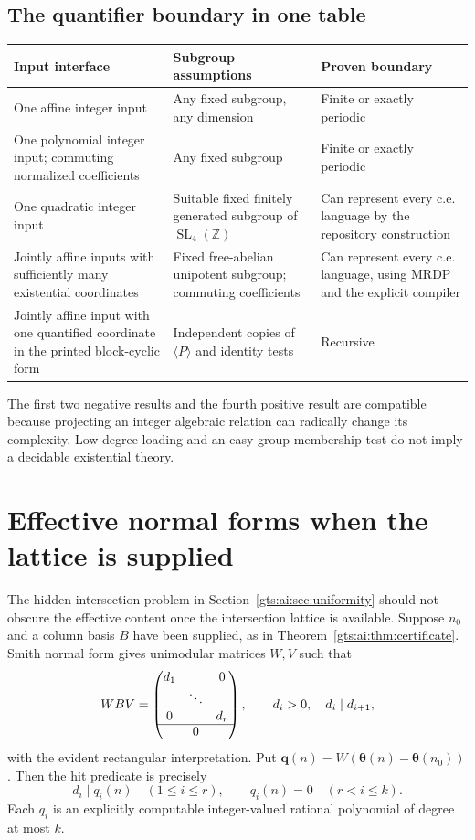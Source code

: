 \documentclass[11pt,letterpaper]{article}
\theoremstyle{definition}
\theoremstyle{remark}
\newcommand{\Z}{\mathbb Z}
\newcommand{\SL}{\operatorname{SL}}
\newcommand{\vv}{\boldsymbol\theta}
\begin{document}
\subsection{The quantifier boundary in one table}
\begin{center}
\begin{tabular}{p{}p{}p{}}
\toprule
Input interface & Subgroup assumptions & Proven boundary\\
\midrule
One affine integer input & Any fixed subgroup, any dimension & Finite or exactly periodic\\[3pt]
One polynomial integer input; commuting normalized coefficients & Any fixed subgroup & Finite or exactly periodic\\[3pt]
One quadratic integer input & Suitable fixed finitely generated subgroup of $\SL_4(\Z)$ & Can represent every c.e. language by the repository construction\\[3pt]
Jointly affine inputs with sufficiently many existential coordinates & Fixed free-abelian unipotent subgroup; commuting coefficients & Can represent every c.e. language, using MRDP and the explicit compiler\\[3pt]
Jointly affine input with one quantified coordinate in the printed block-cyclic form & Independent copies of $\langle P\rangle$ and identity tests & Recursive\\
\bottomrule
\end{tabular}
\end{center}
The first two negative results and the fourth positive result are compatible because projecting an integer algebraic relation can radically change its complexity. Low-degree loading and an easy group-membership test do not imply a decidable existential theory.

\section{Effective normal forms when the lattice is supplied}\label{gts:ai:sec:effective}
The hidden intersection problem in Section~\ref{gts:ai:sec:uniformity} should not obscure the effective content once the intersection lattice is available. Suppose $n_0$ and a column basis $B$ have been supplied, as in Theorem~\ref{gts:ai:thm:certificate}. Smith normal form gives unimodular matrices $W,V$ such that
\[
 WBV=\begin{pmatrix}
 d_1&&0\\&\ddots&\\0&&d_r\\\hline
 \multicolumn{3}{c}{0}
 \end{pmatrix},\qquad
 d_i>0,\quad d_i\mid d_{i+1},
\]
with the evident rectangular interpretation. Put
$\mathbf q(n)=W(\vv(n)-\vv(n_0))$. Then the hit predicate is precisely
\begin{equation}\label{gts:ai:eq:smith}
 d_i\mid q_i(n)\quad(1\le i\le r),
 \qquad q_i(n)=0\quad(r<i\le k).
\end{equation}
Each $q_i$ is an explicitly computable integer-valued rational polynomial of degree at most $k$.
\end{document}
